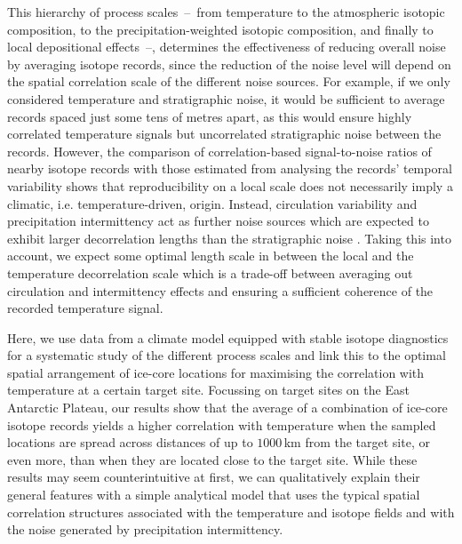 \documentclass[cp, manuscript]{copernicus}
\begin{document}
This hierarchy of process scales~--~from temperature to the atmospheric isotopic
composition, to the precipitation-weighted isotopic composition, and finally to
local depositional effects~--, determines the effectiveness of reducing overall
noise by averaging isotope records, since the reduction of the noise level will
depend on the spatial correlation scale of the different noise sources. For
example, if we only considered temperature and stratigraphic noise, it would be
sufficient to average records spaced just some tens of metres apart, as this
would ensure highly correlated temperature signals but uncorrelated
stratigraphic noise between the records. However, the comparison of
correlation-based signal-to-noise ratios of nearby isotope records
\citep{Munch2016,Munch2017} with those estimated from analysing the records'
temporal variability \citep{Laepple2018} shows that reproducibility on a local
scale does not necessarily imply a climatic, i.e. temperature-driven,
origin. Instead, circulation variability and precipitation intermittency act as
further noise sources which are expected to exhibit larger decorrelation lengths
than the stratigraphic noise \citep{Laepple2018,Munch2018a}. Taking this into
account, we expect some optimal length scale in between the local and the
temperature decorrelation scale which is a trade-off between averaging out
circulation and intermittency effects and ensuring a sufficient coherence of the
recorded temperature signal.

Here, we use data from a climate model equipped with stable isotope diagnostics
for a systematic study of the different process scales and link this to the
optimal spatial arrangement of ice-core locations for maximising the correlation
with temperature at a certain target site. Focussing on target sites on the East
Antarctic Plateau, our results show that the average of a combination of
ice-core isotope records yields a higher correlation with temperature when the
sampled locations are spread across distances of up to $1000$\,km from the
target site, or even more, than when they are located close to the target
site. While these results may seem counterintuitive at first, we can
qualitatively explain their general features with a simple analytical model that
uses the typical spatial correlation structures associated with the temperature
and isotope fields and with the noise generated by precipitation intermittency.
\end{document}
